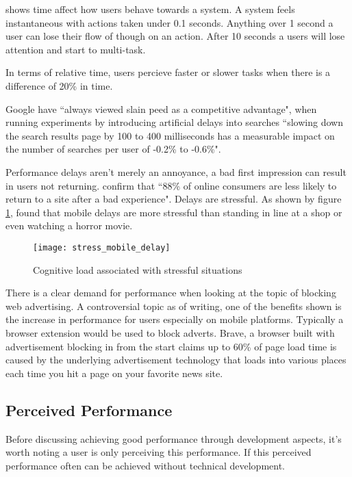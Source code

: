 \cite{usability_engineering} shows time affect how users behave towards a system. A system feels instantaneous with actions taken under 0.1 seconds. Anything over 1 second a user can lose their flow of though on an action. After 10 seconds a users will lose attention and start to multi-task.

In terms of relative time, users percieve faster or slower tasks when there is a difference of 20\% in time. \cite{setting_a_performance_budget}

Google have ``always viewed slain peed as a competitive advantage", when running experiments by introducing artificial delays into searches ``slowing down the search results page by 100 to 400 milliseconds has a measurable impact on the number of searches per user of -0.2\% to -0.6\%". \cite{speed_matters}

Performance delays aren't merely an annoyance, a bad first impression can result in users not returning. \cite{why_web_performance_matters} confirm that ``88\% of online consumers are less likely to return to a site after a bad experience". Delays are stressful. As shown by figure \ref{figure-stress-mobile-delay}, \cite{ericsson} found that mobile delays are more stressful than standing in line at a shop or even watching a horror movie.

\begin{figure}[H]
  \centering
    \texttt{[image: stress\_mobile\_delay]}
  \caption{Cognitive load associated with stressful situations \protect\cite{ericsson}}
  \label{figure-stress-mobile-delay}
\end{figure}

There is a clear demand for performance when looking at the topic of blocking web advertising. A controversial topic as of writing, one of the benefits shown is the increase in performance for users especially on mobile platforms. Typically a browser extension would be used to block adverts. Brave, a browser built with advertisement blocking in from the start claims up to 60\% of page load time is caused by the underlying advertisement technology that loads into various places each time you hit a page on your favorite news site. \cite{brave}

\subsection{Perceived Performance} \label{l-r--perceived-performance}

Before discussing achieving good performance through development aspects, it's worth noting a user is only perceiving this performance. If this perceived performance often can be achieved without technical development.

